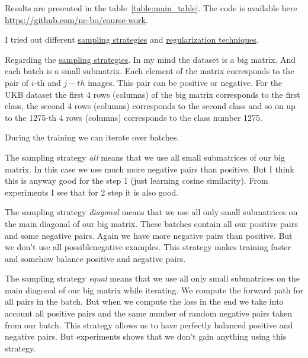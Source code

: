 \documentclass[10pt,a4paper]{article}
\begin{document}
    Results are presented in the table~\ref{table:main_table}.
    The code is available here \url{https://github.com/ne-bo/course-work}.
    \newline

    I tried out different \underline{sampling strategies} and \underline{regularization techniques}.
    \newline

    Regarding the \underline{sampling strategies}. In my mind the dataset is a big matrix. And each batch is a small submatrix.
    Each element of the matrix corresponds to the pair of $i$-th and $j-th$ images. This pair can be positive or negative.
    For the UKB dataset the first 4 rows (columns) of the big matrix corresponds to the first class, the second 4 rows (columns)
    corresponds to the second class and so on up to the 1275-th 4 rows (columns) corresponds to the class number 1275.
    \newline

    During the training we can iterate over batches.
    \newline

    The sampling strategy \textit{all} means that we use all small submatrices of our big matrix. In this case we use
    much more negative pairs than positive. But I think this is anyway good for the step 1 (just learning cosine similarity).
    From experiments I see that for 2 step it is also good.
    \newline

    The sampling strategy \textit{diagonal} means that we use all only small submatrices on the main diagonal of our big matrix.
    These batches contain all our positive pairs and some negative pairs. Again we have more negative pairs than positive.
    But we don't use all possiblenegative examples. This strategy makes training faster and somehow balance positive and negative pairs.
    \newline

    The sampling strategy \textit{equal} means that we use all only small submatrices on the main diagonal of our big matrix while iterating.
    We compute the forward path for all pairs in the batch. But when we compute the loss in the end we take into account all positive pairs
    and the same number of random negative pairs taken from our batch. This strategy allows us to have perfectly balanced positive and negative pairs.
    But experiments shows that we don't gain anything using this strategy.
    \newline
\end{document}
